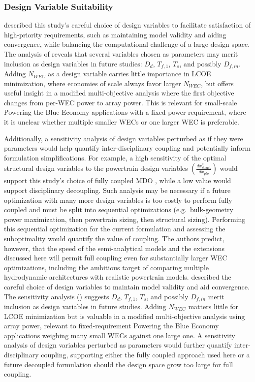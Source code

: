 \subsubsection{Design Variable Suitability}
\ifdefined\DISSERTATION
     described this study's careful choice of design variables to facilitate satisfaction of high-priority requirements, such as maintaining model validity and aiding convergence, while balancing the computational challenge of a large design space.
    The analysis of  reveals that several variables chosen as parameters may merit inclusion as design variables in future studies: $D_d$, $T_{f,1}$, $T_s$, and possibly $D_{f,in}$.
    Adding $N_{WEC}$ as a design variable carries little importance in LCOE minimization, where economies of scale always favor larger $N_{WEC}$, but offers useful insight in a modified multi-objective analysis where the first objective changes from per-WEC power to array power.
    This is relevant for small-scale Powering the Blue Economy applications with a fixed power requirement, where it is unclear whether multiple smaller WECs or one larger WEC is preferable.
    
    Additionally, a sensitivity analysis of design variables perturbed as if they were parameters would help quantify inter-disciplinary coupling and potentially inform formulation simplifications.
    For example, a high sensitivity of the optimal structural design variables to the powertrain design variables $\left(\frac{dx^*_{\text{struct}}}{dx_{pto}}\right)$ would support this study's choice of fully coupled MDO \cite{mccabe_development_2026}, while a low value would support disciplinary decoupling.
    Such analysis may be necessary if a future optimization with many more design variables is too costly to perform fully coupled and must be split into sequential optimizations (e.g.\ bulk-geometry power maximization, then powertrain sizing, then structural sizing).
    Performing this sequential optimization for the current formulation and assessing the suboptimality would quantify the value of coupling.
    The authors predict, however, that the speed of the semi-analytical models and the extensions discussed here will permit full coupling even for substantially larger WEC optimizations, including the ambitious target of comparing multiple hydrodynamic architectures with realistic powertrain models.
\else
     described the careful choice of design variables to maintain model validity and aid convergence.
    The sensitivity analysis () suggests $D_d$, $T_{f,1}$, $T_s$, and possibly $D_{f,in}$ merit inclusion as design variables in future studies.
    Adding $N_{WEC}$ matters little for LCOE minimization but is valuable in a modified multi-objective analysis using array power, relevant to fixed-requirement Powering the Blue Economy applications weighing many small WECs against one large one.
    A sensitivity analysis of design variables perturbed as parameters would further quantify inter-disciplinary coupling, supporting either the fully coupled approach used here \cite{mccabe_development_2026} or a future decoupled formulation should the design space grow too large for full coupling.
\fi

